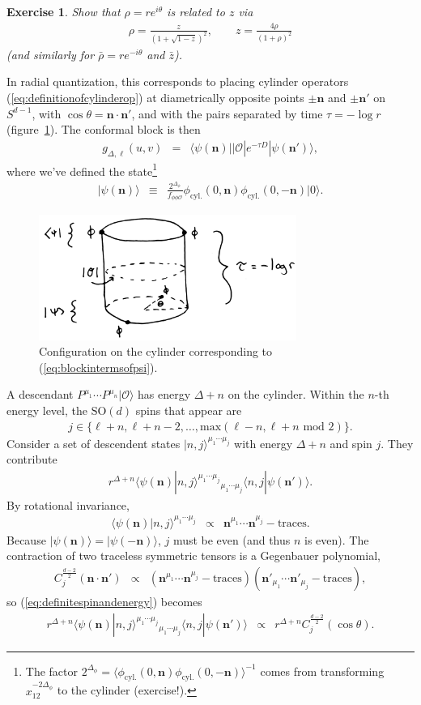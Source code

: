 \documentclass{ws-rv9x6}
\newcommand\be{\begin{eqnarray}}
\newcommand\ee{\end{eqnarray}}
\newcommand\f\phi
\newcommand\cO{\mathcal{O}}
\newcommand\<\langle
\renewcommand\>\rangle
\renewcommand\.{\cdot}
\newcommand\SO{\mathrm{SO}}
\newcommand\De{\Delta}
\newcommand\bn{\mathbf{n}}
\renewcommand\th{\theta}
\newtheorem{exercise}{Exercise}[section]
\begin{document}
\begin{exercise}
Show that $\rho=re^{i\theta}$ is related to $z$ via
\be
\label{eq:radialcoordinatedefinition}
\rho = \frac{z}{(1+\sqrt{1-z})^2},\qquad z = \frac{4\rho}{(1+\rho)^2}
\ee
(and similarly for $\bar\rho=r e^{-i\theta}$ and $\bar z$).
\end{exercise}

In radial quantization, this corresponds to placing cylinder operators (\ref{eq:definitionofcylinderop}) at diametrically opposite points $\pm \bn$ and $\pm \bn'$ on $S^{d-1}$, with $\cos\th=\bn\.\bn'$, and with the pairs separated by time $\tau=-\log r$ (figure~\ref{fig:cylinderconfig}).  The conformal block is then
\be
\label{eq:blockintermsofpsi}
 g_{\De,\ell}(u,v) &=& \<\psi(\bn)||\cO|e^{-\tau D}|\psi(\bn')\>,
\ee
where we've defined the state\footnote{The factor $2^{\De_\f}=\<\f_\mathrm{cyl.}(0,\bn)\f_\mathrm{cyl.}(0,-\bn)\>^{-1}$ comes from transforming $x_{12}^{-2\De_\f}$ to the cylinder (exercise!).}
\be
|\psi(\bn)\> &\equiv& \frac{2^{\De_\f}}{f_{\f\f\cO}}\phi_\mathrm{cyl.}(0,\bn)\phi_\mathrm{cyl.}(0,-\bn)|0\>.
\ee


\begin{figure}
\begin{center}
\includegraphics[width=0.75\textwidth]{cylinderconfig.jpg}
\end{center}
\caption{Configuration on the cylinder corresponding to (\ref{eq:blockintermsofpsi}).  \label{fig:cylinderconfig}}
\end{figure}

A descendant $P^{\mu_1}\cdots P^{\mu_n}|\cO\>$ has energy $\De+n$ on the cylinder.  Within the $n$-th energy level, the $\SO(d)$ spins that appear are
\be
\label{eq:rangeofjs}
j \in \{\ell+n,\ell+n-2,\dots,\mathrm{max}(\ell-n,\ell+n\,\,\mathrm{mod}\,\,2)\}.
\ee
Consider a set of descendent states $|n,j\>^{\mu_1\cdots\mu_j}$ with energy $\De+n$ and spin $j$. They contribute
\be
r^{\De+n} \<\psi(\bn)|n,j\>^{\mu_1\cdots\mu_j}{}_{\mu_1\cdots\mu_j}\<n,j|\psi(\bn')\>.
\label{eq:definitespinandenergy}
\ee
By rotational invariance,
\be
\<\psi(\bn)|n,j\>^{\mu_1\cdots\mu_j} &\propto& \bn^{\mu_1}\cdots\bn^{\mu_j}-\mathrm{traces}.
\ee
Because $|\psi(\bn)\>=|\psi(-\bn)\>$, $j$ must be even (and thus $n$ is even).
The contraction of two traceless symmetric tensors is a Gegenbauer polynomial,
\be
C_j^{\frac{d-2}{2}}(\bn\cdot\bn') &\propto& (\bn^{\mu_1}\cdots\bn^{\mu_j}-\mathrm{traces})(\bn'_{\mu_1}\cdots\bn'_{\mu_j}-\mathrm{traces}),
\ee
so (\ref{eq:definitespinandenergy}) becomes
\be
r^{\De+n} \<\psi(\bn)|n,j\>^{\mu_1\cdots\mu_j}{}_{\mu_1\cdots\mu_j}\<n,j|\psi(\bn')\> &\propto& r^{\De+n}C_j^{\frac{d-2}{2}}(\cos\th).
\ee
\end{document}
